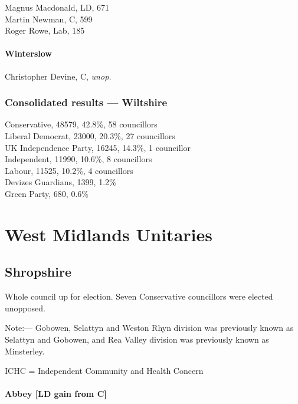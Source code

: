 \documentclass[a4paper,openany,10pt]{book}
\begin{document}


Magnus Macdonald, LD, 671\\
Martin Newman, C, 599\\
Roger Rowe, Lab, 185\\


\subsubsection*{Winterslow}



Christopher Devine, C, \emph{unop.}\\




\subsection*{Consolidated results --- Wiltshire}
Conservative, 48579, 42.8\%, 58 councillors\\
Liberal Democrat, 23000, 20.3\%, 27 councillors\\
UK Independence Party, 16245, 14.3\%, 1 councillor\\
Independent, 11990, 10.6\%, 8 councillors\\
Labour, 11525, 10.2\%, 4 councillors\\
Devizes Guardians, 1399, 1.2\% \\
Green Party, 680, 0.6\% \\


\chapter{West Midlands Unitaries}

\section{Shropshire}

Whole council up for election. Seven Conservative councillors were elected unopposed.

Note:— Gobowen, Selattyn and Weston Rhyn division was previously known as Selattyn and Gobowen, and Rea Valley division was previously known as Minsterley.

ICHC = Independent Community and Health Concern



\subsubsection*{Abbey \hspace*{\fill}\nolinebreak[1]%
\enspace\hspace*{\fill}
[LD gain from C]}
\end{document}
